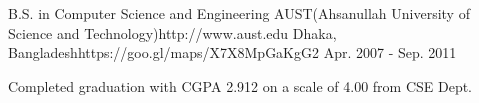 

\begin{workentries}

  \workentry
    {B.S. in Computer Science and Engineering} %
    {AUST(Ahsanullah University of Science and Technology)}{http://www.aust.edu} %
    {Dhaka, Bangladesh}{https://goo.gl/maps/X7X8MpGaKgG2} %
    {Apr. 2007 - Sep. 2011} %
    {
      \begin{workitems} %
        \item {Completed graduation with CGPA 2.912 on a scale of 4.00 from CSE Dept.}
      \end{workitems}
    }

\end{workentries}
